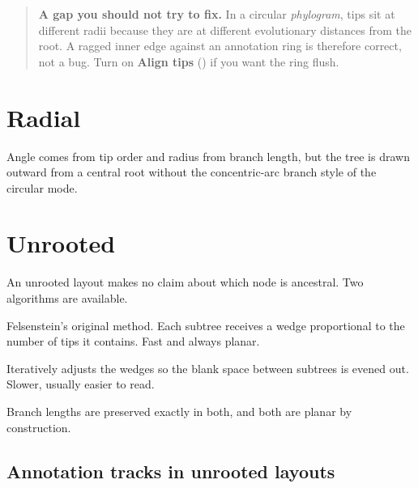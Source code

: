 
\begin{quote}
\textbf{A gap you should not try to fix.} In a circular \emph{phylogram}, tips sit
at different radii because they are at different evolutionary distances from the
root. A ragged inner edge against an annotation ring is therefore correct, not a
bug. Turn on \textbf{Align tips} () if you want the ring flush.
\end{quote}

\section{Radial}

Angle comes from tip order and radius from branch length, but the tree is drawn
outward from a central root without the concentric-arc branch style of the
circular mode.


\section{Unrooted}

An unrooted layout makes no claim about which node is ancestral. Two algorithms
are available.

\begin{description}[style=nextline,leftmargin=0pt,labelindent=0pt,labelwidth=0pt]
  \item[Equal-angle] Felsenstein's original method. Each subtree receives a wedge
    proportional to the number of tips it contains. Fast and always planar.
  \item[Equal-daylight] Iteratively adjusts the wedges so the blank space between
    subtrees is evened out. Slower, usually easier to read.
\end{description}

Branch lengths are preserved exactly in both, and both are planar by
construction.



\subsection{Annotation tracks in unrooted layouts}
\label{sec:unrooted-tracks}

